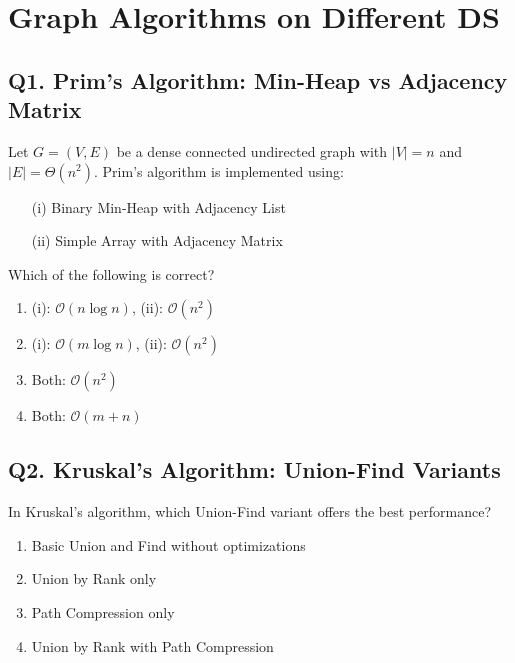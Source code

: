 
\section{Graph Algorithms on Different DS}

\subsection*{Q1. Prim’s Algorithm: Min-Heap vs Adjacency Matrix}
Let $G = (V, E)$ be a dense connected undirected graph with $|V| = n$ and $|E| = \Theta(n^2)$. Prim’s algorithm is implemented using:

\begin{itemize}
    \item[(i)] Binary Min-Heap with Adjacency List
    \item[(ii)] Simple Array with Adjacency Matrix
\end{itemize}

Which of the following is correct?

\begin{enumerate}[label=(\alph*)]
    \item (i): $\mathcal{O}(n \log n)$, (ii): $\mathcal{O}(n^2)$
    \item (i): $\mathcal{O}(m \log n)$, (ii): $\mathcal{O}(n^2)$
    \item Both: $\mathcal{O}(n^2)$
    \item Both: $\mathcal{O}(m + n)$
\end{enumerate}

\vspace{1em}
\subsection*{Q2. Kruskal’s Algorithm: Union-Find Variants}
In Kruskal’s algorithm, which Union-Find variant offers the best performance?

\begin{enumerate}[label=(\alph*)]
    \item Basic Union and Find without optimizations
    \item Union by Rank only
    \item Path Compression only
    \item Union by Rank with Path Compression
\end{enumerate}

